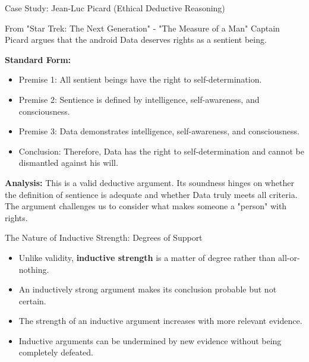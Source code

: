 \documentclass{beamer}
\begin{document}
\begin{frame}{Case Study: Jean-Luc Picard (Ethical Deductive Reasoning)}
    \begin{block}{From "Star Trek: The Next Generation" - "The Measure of a Man"}
        Captain Picard argues that the android Data deserves rights as a sentient being.
    \end{block}
    \small
    \textbf{Standard Form:}
    \begin{itemize}
        \item Premise 1: All sentient beings have the right to self-determination.
        \item Premise 2: Sentience is defined by intelligence, self-awareness, and consciousness.
        \item Premise 3: Data demonstrates intelligence, self-awareness, and consciousness.
        \item Conclusion: Therefore, Data has the right to self-determination and cannot be dismantled against his will.
    \end{itemize}
    
    \textbf{Analysis:} This is a valid deductive argument. Its soundness hinges on whether the definition of sentience is adequate and whether Data truly meets all criteria. The argument challenges us to consider what makes someone a "person" with rights.
\end{frame}

\begin{frame}{The Nature of Inductive Strength: Degrees of Support}
    \begin{itemize}
        \item Unlike validity, \textbf{inductive strength} is a matter of degree rather than all-or-nothing.
        \item An inductively strong argument makes its conclusion probable but not certain.
        \item The strength of an inductive argument increases with more relevant evidence.
        \item Inductive arguments can be undermined by new evidence without being completely defeated.
    \end{itemize}
    
\end{frame}
\end{document}
